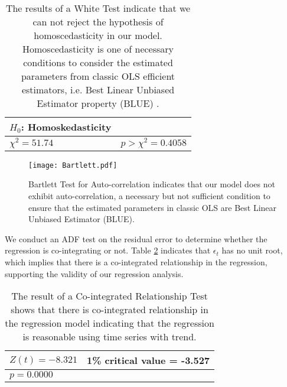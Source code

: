 \documentclass[10pt]{article}
\begin{document}
 \begin {table}
	 \begin {center}
		 \begin {tabular} {ll}
		\hline
		$H_0$: Homoskedasticity    &  \\
		\hline
		$\chi^2=51.74$                         &  $p> \chi^2 = 0.4058$\\
		\hline
		 \end {tabular}
	 \caption{ \label{WhiteTest}The results of a White Test indicate that we can not reject the hypothesis of homoscedasticity in our model. Homoscedasticity is one of necessary conditions to consider the estimated parameters from classic OLS efficient  estimators, i.e. Best Linear Unbiased Estimator property (BLUE) \cite{Gujarati2008}.}
	  \end{center}
 \end {table}


\begin{figure}[h!]
	\begin{center}
	      \texttt{[image: Bartlett.pdf]}
\caption{ \label{Bartlett} Bartlett Test for Auto-correlation indicates that our model does not exhibit auto-correlation, a necessary but not sufficient condition to ensure that the estimated parameters in classic OLS are Best Linear Unbiased Estimator (BLUE).}
	\end{center}
\end{figure}


We conduct an ADF test on the residual error \cite{Dickey1991} to determine whether the regression is co-integrating or not. Table \ref{ ADF Test to $epsilon_t$} indicates that $\epsilon_t$  has no unit root, which implies that there is a co-integrated relationship in the regression, supporting the validity of our regression analysis.
 
 
 \begin {table}
 \begin {center}
 \begin {tabular} {ll}
\hline
$Z(t)=-8.321$    &    1\% critical value = -3.527\\
\hline
$p=0.0000$     &                  \\
\hline
 \end {tabular}
 \caption{The result of a  Co-integrated Relationship Test shows that there is co-integrated relationship in the regression model indicating that the regression is reasonable using time series with trend.}
 \label{ ADF Test to $epsilon_t$}
 \end{center}
 \end {table}
\end{document}
